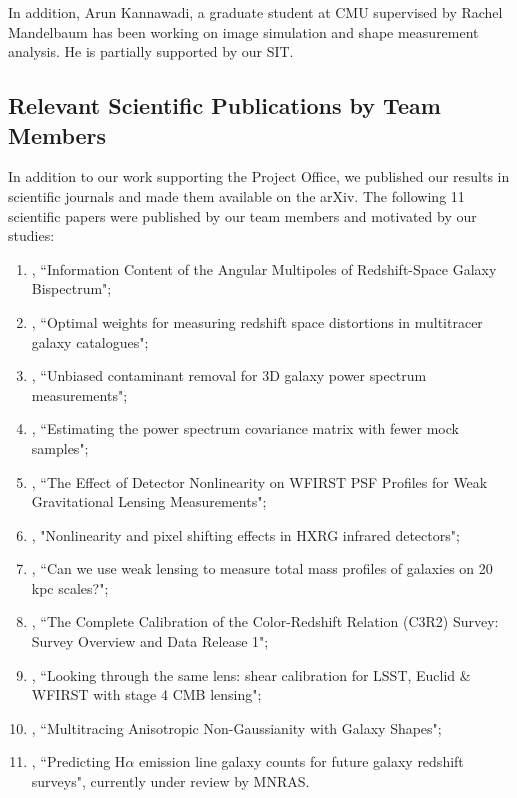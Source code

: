 In addition, Arun Kannawadi, a graduate student at CMU supervised by Rachel Mandelbaum has been working on image simulation and shape measurement analysis. He is partially supported by our SIT.

\subsection{Relevant Scientific Publications by Team Members}

In addition to our work supporting the Project Office, we published our results in scientific journals and made them available on the arXiv. The following 11 scientific papers were published by our team members and motivated by our studies:

\begin{enumerate}
\item \citet{2017MNRAS.467..928G}, ``Information Content of the Angular Multipoles of Redshift-Space Galaxy Bispectrum";
\item \citet{2016MNRAS.463.2708P}, ``Optimal weights for measuring redshift space distortions in multitracer galaxy catalogues";
\item \citet{2016MNRAS.463..467K}, ``Unbiased contaminant removal for 3D galaxy power spectrum measurements";
\item \citet{2016MNRAS.457..993P}, ``Estimating the power spectrum covariance matrix with fewer mock samples";
\item \citet{2016PASP..128j4001P}, ``The Effect of Detector Nonlinearity on WFIRST PSF Profiles for Weak Gravitational Lensing Measurements";
\item \citet{2017JInst..12C4009P}, "Nonlinearity and pixel shifting effects in HXRG infrared detectors";
\item \citet{2015MNRAS.449.2128K}, ``Can we use weak lensing to measure total mass profiles of galaxies on 20 kpc scales?";
\item \citet{Masters2017}, ``The Complete Calibration of the Color-Redshift Relation (C3R2) Survey: Survey Overview and Data Release 1";
\item \citet{Schaan:2016ois}, ``Looking through the same lens: shear calibration for LSST, Euclid \& WFIRST with stage 4 CMB lensing";
\item \citet{Chisari:2016xki}, ``Multitracing Anisotropic Non-Gaussianity with Galaxy Shapes";
\item \citet{Merson2017}, ``Predicting H$\alpha$ emission line galaxy counts for future galaxy redshift surveys", currently under review by MNRAS.
\end{enumerate}

